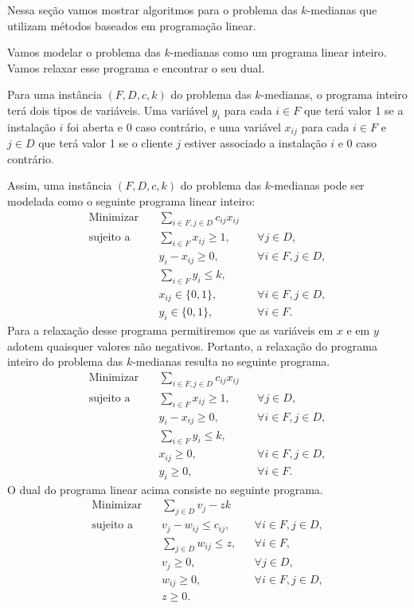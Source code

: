 Nessa seção vamos mostrar algoritmos para o problema das $k$-medianas que utilizam métodos baseados em programação linear.

Vamos modelar o problema das $k$-medianas como um programa linear inteiro. Vamos relaxar esse programa e encontrar o seu dual.

Para uma instância $(F,D,c,k)$ do problema das $k$-medianas, o programa inteiro terá dois tipos de variáveis. Uma variável $y_i$ para cada $i \in F$ que terá valor 1 se a instalação $i$ foi aberta e 0 caso contrário, e uma variável $x_{ij}$ para cada $i \in F$ e $j \in D$ que terá valor 1 se o cliente $j$ estiver associado a instalação $i$ e 0 caso contrário. 

Assim, uma instância $(F,D,c,k)$ do problema das $k$-medianas pode ser modelada como o seguinte programa linear inteiro:
\begin{align*}
\text{Minimizar} \quad & \sum_{i \in F, j \in D} c_{ij}x_{ij} \\
\text{sujeito a} \quad & \sum_{i \in F} x_{ij} \geq 1, &&\forall j \in D, \\
                       & y_i - x_{ij} \geq 0, &&\forall i \in F, j \in D, \\
                       & \sum_{i \in F} y_i \leq k, \\
                       & x_{ij} \in \{0,1\}, && \forall i \in F,j \in D, \\
                       & y_i \in \{0,1\}, &&\forall i \in F. 
\end{align*}
Para a relaxação desse programa permitiremos que as variáveis em $x$ e em $y$ adotem quaisquer valores não negativos. Portanto, a relaxação do programa inteiro do problema das $k$-medianas resulta no seguinte programa.
\begin{align}
    \text{Minimizar} \quad & \sum_{i \in F, j \in D} c_{ij}x_{ij} \nonumber \\
    \text{sujeito a} \quad & \sum_{i \in F} x_{ij} \geq 1, &&\forall j \in D, \nonumber\\
                           & y_i - x_{ij} \geq 0, &&\forall i \in F, j \in D, \nonumber \\
                           & \sum_{i \in F} y_i \leq k, \\
                           & x_{ij} \geq 0, && \forall i \in F,j \in D, \nonumber \\
                           & y_i \geq 0, &&\forall i \in F. \nonumber 
\end{align}
O dual do programa linear acima consiste no seguinte programa.
\begin{align*}
    \text{Minimizar} \quad & \sum_{j \in D} v_j - zk \\
    \text{sujeito a} \quad & v_j - w_{ij} \leq c_{ij}, &&\forall i \in F, j\in D, \\
                           & \sum_{j\in D} w_{ij} \leq z, &&\forall i \in F, \\
                           & v_j \geq 0, &&\forall j\in D, \\
                           & w_{ij} \geq 0, && \forall i \in F,j \in D, \\
                           & z \geq 0. 
\end{align*}

